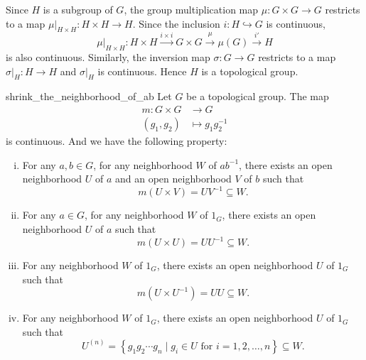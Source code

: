 \documentclass{report}
\begin{document}
\begin{prf}
	Since $H$ is a subgroup of $G$, the group multiplication map $\mu:G\times G\to G$ restricts to a map $\mu|_{H\times H}:H\times H\to H$. Since the inclusion $i:H\hookrightarrow G$ is continuous,
	\[
		\mu|_{H\times H}:H \times H \xrightarrow{i\times i} G\times G\xrightarrow{\mu}\mu(G)  \xrightarrow{i'} H
	\]
	is also continuous. Similarly, the inversion map $\sigma:G\to G$ restricts to a map $\sigma|_H:H\to H$ and $\sigma|_H$ is continuous. Hence $H$ is a topological group.

\end{prf}


\begin{lemma}{}{shrink_the_neighborhood_of_ab}
	Let $G$ be a topological group. The map 
	\begin{align*}
		m:G\times G & \longrightarrow G       \\
		(g_1,g_2)   & \longmapsto g_1g_2^{-1}
	\end{align*}
	is continuous. And we have the following property:
	\begin{enumerate}[(i)]
		\item For any $a ,b\in G$, for any neighborhood $W$ of $ab^{-1}$, there exists an open neighborhood $U$ of $a$ and an open neighborhood $V$ of $b$ such that 
		\[
		m(U\times V)=U V^{-1}\subseteq W.
		\]
		\item For any $a \in G$, for any neighborhood $W$ of $1_G$, there exists an open neighborhood $U$ of $a$ such that 
		\[
		m(U\times U)=U U^{-1}\subseteq W.
		\]
		\item For any neighborhood $W$ of $1_G$, there exists an open neighborhood $U$ of $1_G$ such that 
		\[
		m(U\times U^{-1})=U U\subseteq W.
		\]
		\item For any neighborhood $W$ of $1_G$, there exists an open neighborhood $U$ of $1_G$ such that 
		\[
		U^{(n)}=\left\{ g_1 g_2 \cdots g_n \mid g_i\in U \text{ for } i=1,2,\ldots,n\right\} \subseteq W.
		\]
	\end{enumerate}
\end{lemma}
\end{document}
